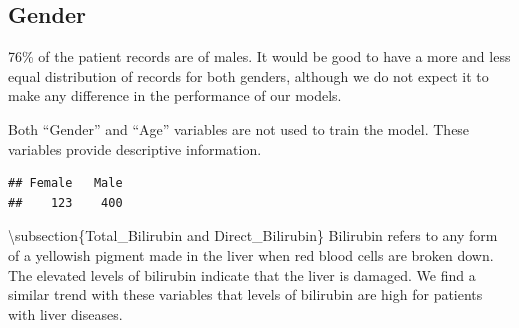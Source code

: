 \documentclass[]{article}
\newenvironment{Shaded}{\begin{snugshade}}{\end{snugshade}}
\newcommand{\CommentTok}[1]{\textcolor[rgb]{0.56,0.35,0.01}{\textit{#1}}}
\newcommand{\DataTypeTok}[1]{\textcolor[rgb]{0.13,0.29,0.53}{#1}}
\newcommand{\KeywordTok}[1]{\textcolor[rgb]{0.13,0.29,0.53}{\textbf{#1}}}
\newcommand{\NormalTok}[1]{#1}
\newcommand{\OperatorTok}[1]{\textcolor[rgb]{0.81,0.36,0.00}{\textbf{#1}}}
\newcommand{\StringTok}[1]{\textcolor[rgb]{0.31,0.60,0.02}{#1}}
\begin{document}
\subsection{Gender}

76\% of the patient records are of males. It would be good to have a
more and less equal distribution of records for both genders, although
we do not expect it to make any difference in the performance of our
models.

Both ``Gender'' and ``Age'' variables are not used to train the model.
These variables provide descriptive information.

\begin{Shaded}
\end{Shaded}

\begin{verbatim}
## Female   Male 
##    123    400
\end{verbatim}

\textbackslash subsection\{Total\_Bilirubin and Direct\_Bilirubin\}
Bilirubin refers to any form of a yellowish pigment made in the liver
when red blood cells are broken down. The elevated levels of bilirubin
indicate that the liver is damaged. We find a similar trend with these
variables that levels of bilirubin are high for patients with liver
diseases.

\begin{Shaded}
\end{Shaded}
\end{document}
